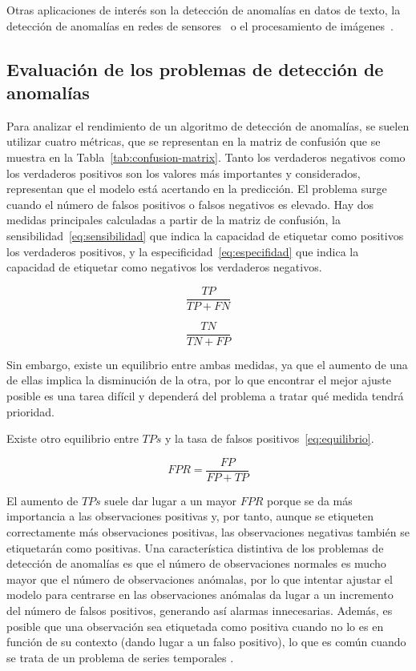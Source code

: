 \documentclass{article}
\begin{document}
	Otras aplicaciones de interés son la detección de anomalías en datos de texto, la detección de anomalías en redes de sensores~\cite{kraljevski2021machine} o el procesamiento de imágenes~\cite{pang2021deep}.
	
	\subsection{Evaluación de los problemas de detección de anomalías}
	
	Para analizar el rendimiento de un algoritmo de detección de anomalías, se suelen utilizar cuatro métricas, que se representan en la matriz de confusión que se muestra en la Tabla~\ref{tab:confusion-matrix}. Tanto los verdaderos negativos como los verdaderos positivos son los valores más importantes y considerados, representan que el modelo está acertando en la predicción. El problema surge cuando el número de falsos positivos o falsos negativos es elevado. Hay dos medidas principales calculadas a partir de la matriz de confusión, la sensibilidad~\ref{eq:sensibilidad} que indica la capacidad de etiquetar como positivos los verdaderos positivos, y la especificidad~\ref{eq:especifidad} que indica la capacidad de etiquetar como negativos los verdaderos negativos.
	
	\begin{equation}
		\label{eq:sensibilidad}
		\frac{TP}{TP+FN}
	\end{equation}
	
	\begin{equation}
		\label{eq:especifidad}
		\frac{TN}{TN+FP}
	\end{equation}
		
	Sin embargo, existe un equilibrio entre ambas medidas, ya que el aumento de una de ellas implica la disminución de la otra, por lo que encontrar el mejor ajuste posible es una tarea difícil y dependerá del problema a tratar qué medida tendrá prioridad.
	
	Existe otro equilibrio entre $TPs$ y la tasa de falsos positivos~\ref{eq:equilibrio}.
	
	\begin{equation}
		\label{eq:equilibrio}
		FPR = \frac{FP}{FP+TP}
	\end{equation}
	
	El aumento de $TPs$ suele dar lugar a un mayor $FPR$ porque se da más importancia a las observaciones positivas y, por tanto, aunque se etiqueten correctamente más observaciones positivas, las observaciones negativas también se etiquetarán como positivas. Una característica distintiva de los problemas de detección de anomalías es que el número de observaciones normales es mucho mayor que el número de observaciones anómalas, por lo que intentar ajustar el modelo para centrarse en las observaciones anómalas da lugar a un incremento del número de falsos positivos, generando así alarmas innecesarias. Además, es posible que una observación sea etiquetada como positiva cuando no lo es en función de su contexto (dando lugar a un falso positivo), lo que es común cuando se trata de un problema de series temporales \cite{hundman2018detecting, sridhar2014model}. 
	
\end{document}
